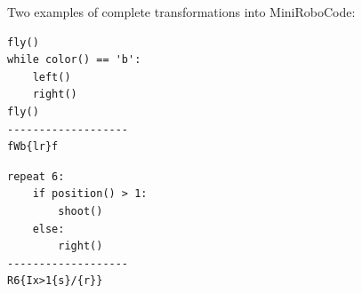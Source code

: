 \smallskip

\noindent
Two examples of complete transformations into MiniRoboCode:
\smallskip

\noindent\begin{minipage}{.49\textwidth}
\begin{lstlisting}[numbers=none]
fly()
while color() == 'b':
    left()
    right()
fly()
-------------------
fWb{lr}f
\end{lstlisting}
\end{minipage}\hfill
\begin{minipage}{.49\textwidth}
\begin{lstlisting}[numbers=none]
repeat 6:
    if position() > 1:
        shoot()
    else:
        right()
-------------------
R6{Ix>1{s}/{r}}
\end{lstlisting}
\end{minipage}
\smallskip


